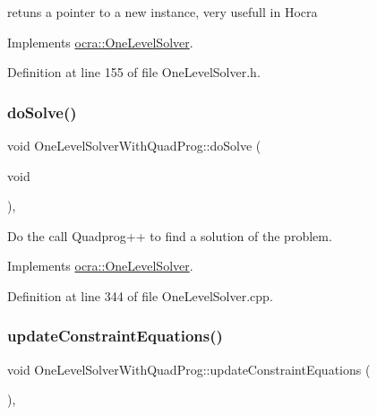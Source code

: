 retuns a pointer to a new instance, very usefull in Hocra 

Implements \hyperlink{classocra_1_1OneLevelSolver_a08ecd92d4295e03aa03075a71d481f48}{ocra\+::\+One\+Level\+Solver}.



Definition at line 155 of file One\+Level\+Solver.\+h.

\hypertarget{classocra_1_1OneLevelSolverWithQuadProg_aa6e7517459ef68106e83a7f0dc09c977}{}\label{classocra_1_1OneLevelSolverWithQuadProg_aa6e7517459ef68106e83a7f0dc09c977} 
\subsubsection{\texorpdfstring{do\+Solve()}{doSolve()}}
{\footnotesize\ttfamily void One\+Level\+Solver\+With\+Quad\+Prog\+::do\+Solve (\begin{DoxyParamCaption}\item[{void}]{ }\end{DoxyParamCaption})\hspace{0.3cm}{\ttfamily [protected]}, {\ttfamily [virtual]}}

Do the call Quadprog++ to find a solution of the problem. 

Implements \hyperlink{classocra_1_1OneLevelSolver_aeb4fb349df382921c5c0064d7a05c48b}{ocra\+::\+One\+Level\+Solver}.



Definition at line 344 of file One\+Level\+Solver.\+cpp.

\hypertarget{classocra_1_1OneLevelSolverWithQuadProg_a0276b1005f8b5812b313aa594d01118a}{}\label{classocra_1_1OneLevelSolverWithQuadProg_a0276b1005f8b5812b313aa594d01118a} 
\subsubsection{\texorpdfstring{update\+Constraint\+Equations()}{updateConstraintEquations()}}
{\footnotesize\ttfamily void One\+Level\+Solver\+With\+Quad\+Prog\+::update\+Constraint\+Equations (\begin{DoxyParamCaption}{ }\end{DoxyParamCaption})\hspace{0.3cm}{\ttfamily [protected]}, {\ttfamily [virtual]}}

